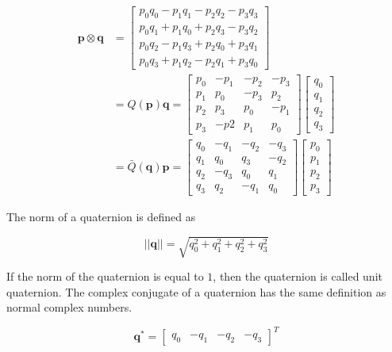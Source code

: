 \begin{align}
	\mathbf{p} \otimes \mathbf{q} &=
	\begin{bmatrix}
		p_0q_0 - p_1q_1 - p_2q_2 - p_3q_3 \\
		p_0q_1 + p_1q_0 + p_2q_3 - p_3q_2 \\
		p_0q_2 - p_1q_3 + p_2q_0 + p_3q_1 \\
		p_0q_3 + p_1q_2 - p_2q_1 + p_3q_0
	\end{bmatrix} \\
	&= Q(\mathbf{p})\mathbf{q} =
	\begin{bmatrix}
		p_0 & -p_1 & -p_2 & -p_3 \\
		p_1 & p_0  & -p_3 & p_2 \\
		p_2 & p_3  & p_0  & -p_1 \\
		p_3 & -p2  & p_1  & p_0
	\end{bmatrix}
	\begin{bmatrix}
		q_0 \\
		q_1 \\
		q_2 \\
		q_3
	\end{bmatrix} \\
	&= \bar{Q}(\mathbf{q})\mathbf{p} = 
	\begin{bmatrix}
		q_0 & -q_1 & -q_2 & -q_3 \\
		q_1 & q_0  & q_3  & -q_2 \\
		q_2 & -q_3 & q_0  & q_1 \\
		q_3 & q_2  & -q_1 & q_0  
	\end{bmatrix}
	\begin{bmatrix}
		p_0 \\
		p_1 \\
		p_2 \\
		p_3
	\end{bmatrix}
	\label{eq:quatKronecker}
\end{align}

\noindent The norm of a quaternion is defined as

\begin{equation}
	||\mathbf{q}|| = \sqrt{q_0^2 + q_1^2 + q_2^2 + q_3^2} 
	\label{eq:quatNorm}
\end{equation}

\noindent If the norm of the quaternion is equal to $1$, then the quaternion is called unit quaternion. The complex conjugate of a quaternion has the same definition as normal complex numbers.

\begin{equation}
	\mathbf{q}^* = 
	\begin{bmatrix}
		q_0 & -q_1 & -q_2 & -q_3
	\end{bmatrix}^T
	\label{eq:quatConj}
\end{equation}

